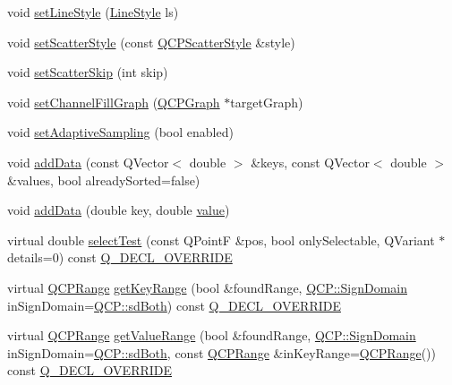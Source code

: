 \begin{DoxyCompactItemize}
\item 
void \mbox{\hyperlink{class_q_c_p_graph_a513fecccff5b2a50ce53f665338c60ff}{set\+Line\+Style}} (\mbox{\hyperlink{class_q_c_p_graph_ad60175cd9b5cac937c5ee685c32c0859}{Line\+Style}} ls)
\item 
void \mbox{\hyperlink{class_q_c_p_graph_a12bd17a8ba21983163ec5d8f42a9fea5}{set\+Scatter\+Style}} (const \mbox{\hyperlink{class_q_c_p_scatter_style}{Q\+C\+P\+Scatter\+Style}} \&style)
\item 
void \mbox{\hyperlink{class_q_c_p_graph_a17cebd3196f434258abb82ba6dc443f2}{set\+Scatter\+Skip}} (int skip)
\item 
void \mbox{\hyperlink{class_q_c_p_graph_a2d03156df1b64037a2e36cfa50351ca3}{set\+Channel\+Fill\+Graph}} (\mbox{\hyperlink{class_q_c_p_graph}{Q\+C\+P\+Graph}} $\ast$target\+Graph)
\item 
void \mbox{\hyperlink{class_q_c_p_graph_ab468cd600160f327836aa0644291e64c}{set\+Adaptive\+Sampling}} (bool enabled)
\item 
void \mbox{\hyperlink{class_q_c_p_graph_ae0555c0d3fe0fa7cb8628f88158d420f}{add\+Data}} (const Q\+Vector$<$ double $>$ \&keys, const Q\+Vector$<$ double $>$ \&values, bool already\+Sorted=false)
\item 
void \mbox{\hyperlink{class_q_c_p_graph_a0bf98b1972286cfb7b1c4b7dd6ae2012}{add\+Data}} (double key, double \mbox{\hyperlink{diffusion_8cpp_a4b41795815d9f3d03abfc739e666d5da}{value}})
\item 
virtual double \mbox{\hyperlink{class_q_c_p_graph_a6d669d04462d272c6aa0e5f85846d673}{select\+Test}} (const Q\+PointF \&pos, bool only\+Selectable, Q\+Variant $\ast$details=0) const \mbox{\hyperlink{qcustomplot_8h_a42cc5eaeb25b85f8b52d2a4b94c56f55}{Q\+\_\+\+D\+E\+C\+L\+\_\+\+O\+V\+E\+R\+R\+I\+DE}}
\item 
virtual \mbox{\hyperlink{class_q_c_p_range}{Q\+C\+P\+Range}} \mbox{\hyperlink{class_q_c_p_graph_aac47c6189e3aea46ea46939e5d14796c}{get\+Key\+Range}} (bool \&found\+Range, \mbox{\hyperlink{namespace_q_c_p_afd50e7cf431af385614987d8553ff8a9}{Q\+C\+P\+::\+Sign\+Domain}} in\+Sign\+Domain=\mbox{\hyperlink{namespace_q_c_p_afd50e7cf431af385614987d8553ff8a9aa38352ef02d51ddfa4399d9551566e24}{Q\+C\+P\+::sd\+Both}}) const \mbox{\hyperlink{qcustomplot_8h_a42cc5eaeb25b85f8b52d2a4b94c56f55}{Q\+\_\+\+D\+E\+C\+L\+\_\+\+O\+V\+E\+R\+R\+I\+DE}}
\item 
virtual \mbox{\hyperlink{class_q_c_p_range}{Q\+C\+P\+Range}} \mbox{\hyperlink{class_q_c_p_graph_a8f773e56f191a61c06e129e90a604d77}{get\+Value\+Range}} (bool \&found\+Range, \mbox{\hyperlink{namespace_q_c_p_afd50e7cf431af385614987d8553ff8a9}{Q\+C\+P\+::\+Sign\+Domain}} in\+Sign\+Domain=\mbox{\hyperlink{namespace_q_c_p_afd50e7cf431af385614987d8553ff8a9aa38352ef02d51ddfa4399d9551566e24}{Q\+C\+P\+::sd\+Both}}, const \mbox{\hyperlink{class_q_c_p_range}{Q\+C\+P\+Range}} \&in\+Key\+Range=\mbox{\hyperlink{class_q_c_p_range}{Q\+C\+P\+Range}}()) const \mbox{\hyperlink{qcustomplot_8h_a42cc5eaeb25b85f8b52d2a4b94c56f55}{Q\+\_\+\+D\+E\+C\+L\+\_\+\+O\+V\+E\+R\+R\+I\+DE}}
\end{DoxyCompactItemize}
